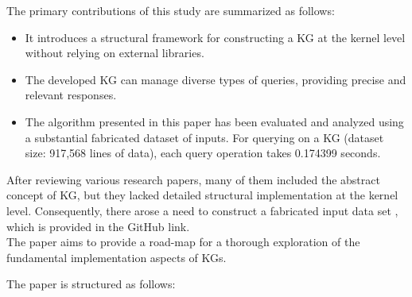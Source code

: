 \documentclass[conference]{IEEEtran}
\begin{document}
The primary contributions of this study are summarized as follows:

\begin{itemize}
    \item It introduces a structural framework for constructing a KG at the kernel level without relying on external libraries.
    \item The developed KG can manage diverse types of queries, providing precise and relevant responses.
    \item The algorithm presented in this paper has been evaluated and analyzed using a substantial fabricated dataset of inputs. For querying on a KG (dataset size: 917,568 lines of data), each query operation takes 0.174399 seconds.
\end{itemize}

After reviewing various research papers, many of them included the abstract concept of KG, but they lacked detailed structural implementation at the kernel level. 
Consequently, there arose a need to construct a fabricated input data set \cite{b11}, which is provided in the GitHub link.\\
The paper aims to provide a road-map for a thorough exploration of the fundamental implementation aspects of KGs.


The paper is structured as follows:

\end{document}
